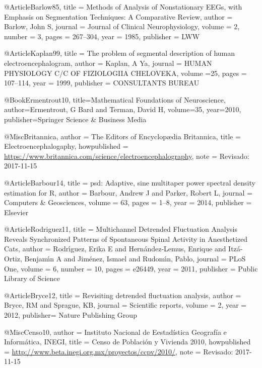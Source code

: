 @Article{Barlow85,
  title   = {{Methods of Analysis of Nonstationary EEGs, with Emphasis on Segmentation Techniques: 
             A Comparative Review}},
  author  = {Barlow, John S},
  journal = {{Journal of Clinical Neurophysiology}},
  volume  = {2},
  number  = {3},
  pages   = {267--304},
  year    = {1985},
  publisher = {LWW}
}

@Article{Kaplan99,
  title   = {The problem of segmental description of human electroencephalogram},
  author  = {Kaplan, A Ya},
  journal = {HUMAN PHYSIOLOGY C/C OF FIZIOLOGIIA CHELOVEKA},
  volume  ={25},
  pages   = {107--114},
  year    = {1999},
  publisher = {CONSULTANTS BUREAU}
}

@Book{Ermentrout10,
    title={Mathematical {F}oundations of {N}euroscience},
    author={Ermentrout, G Bard and Terman, David H},
    volume={35},
    year={2010},
    publisher={Springer {S}cience \& {B}usiness {M}edia}
}


@Misc{Britannica,
    author       = {{{T}he {E}ditors of {E}ncyclop{\ae}dia {Britannica}}},
    title        = {{Electroencephalogaphy}},
    howpublished = {\url{https://www.britannica.com/science/electroencephalography}},
    note         = {Revisado: 2017-11-15}
}

@Article{Barbour14,
    title   = {psd: {A}daptive, sine multitaper power spectral density estimation for {R}},
    author  = {Barbour, Andrew J 
               and Parker, Robert L},
    journal = {Computers \& {G}eosciences},
    volume  = {63},
    pages   = {1--8},
    year    = {2014},
    publisher = {Elsevier}
}


@Article{Rodriguez11,
    title   = {Multichannel {D}etrended {F}luctuation {A}nalysis {R}eveals {S}ynchronized 
               {P}atterns of {S}pontaneous {S}pinal {A}ctivity in {A}nesthetized {C}ats},
    author  = {Rodr{\'\i}guez, Erika E 
               and Hern{\'a}ndez-Lemus, Enrique 
               and Itz{\'a}-Ortiz, Benjam{\'\i}n A 
               and Jim{\'e}nez, Ismael 
               and Rudom{\'\i}n, Pablo},
    journal = {PLoS {O}ne},
    volume  = {6},
    number  = {10},
    pages   = {e26449},
    year    = {2011},
    publisher = {Public Library of Science}
}


@Article{Bryce12,
    title   = {Revisiting detrended fluctuation analysis},
    author  = {Bryce, RM and Sprague, KB},
    journal = {Scientific reports},
    volume  = {2},
    year    = {2012},
    publisher= {Nature Publishing Group}
}

@Misc{Censo10,
    author       = {{Instituto Nacional de Eestadística Geografía e Informática, INEGI}},
    title        = {{Censo de Población y Vivienda 2010}},
    howpublished = {\url{http://www.beta.inegi.org.mx/proyectos/ccpv/2010/}},
    note         = {Revisado: 2017-11-15}
}

